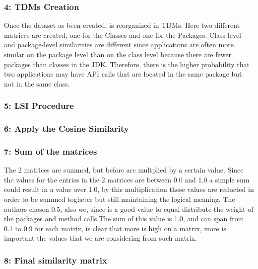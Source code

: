 \subsubsection{4: TDMs Creation}
Once the dataset as been created, is reorganized in TDMs. Here two different matrices are created, one for the Classes and one for the Packages. Class-level and package-level similarities are different since applications are often more similar on the package level than on the class level because there are fewer packages than classes in the JDK. Therefore, there is the higher probability that two applications may have API calls that are located in the same package but not in the same class.

\subsubsection{5: LSI Procedure}

\subsubsection{6: Apply the Cosine Similarity}

\subsubsection{7: Sum of the matrices}
The 2 matrices are summed, but before are multplied by a certain value. Since the values for the entries in the 2 matrices are between 0.0 and 1.0 a simple sum could result in a value over 1.0, by this multiplication these values are reducted in order to be summed togheter but still maintaining the logical meaning. The authors chosen 0.5, also we, since is a good value to equal distribute the weight of the packages and method calls.The sum of this value is 1.0, and can span from 0.1 to 0.9 for each matrix, is clear that more is high on a matrix, more is important the values that we are considering from such matrix.

\subsubsection{8: Final similarity matrix}
